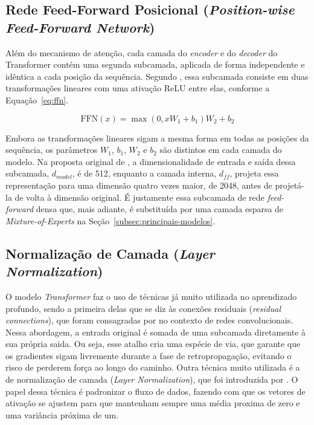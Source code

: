 \subsection{Rede Feed-Forward Posicional (\textit{Position-wise Feed-Forward Network})}

Além do mecanismo de atenção, cada camada do \textit{encoder} e do \textit{decoder} do Transformer contém uma segunda subcamada, aplicada de forma independente e idêntica a cada posição da sequência. Segundo \citet{vaswani2017attention}, essa subcamada consiste em duas transformações lineares com uma ativação ReLU entre elas, conforme a Equação~\eqref{eq:ffn}.

\begin{equation}
\text{FFN}(x) = \max(0, xW_1 + b_1)W_2 + b_2
\label{eq:ffn}
\end{equation}

Embora as transformações lineares sigam a mesma forma em todas as posições da sequência, os parâmetros $W_1$, $b_1$, $W_2$ e $b_2$ são distintos em cada camada do modelo. Na proposta original de \citet{vaswani2017attention}, a dimensionalidade de entrada e saída dessa subcamada, $d_{model}$, é de 512, enquanto a camada interna, $d_{ff}$, projeta essa representação para uma dimensão quatro vezes maior, de 2048, antes de projetá-la de volta à dimensão original. É justamente essa subcamada de rede \textit{feed-forward} densa que, mais adiante, é substituída por uma camada esparsa de \textit{Mixture-of-Experts} na Seção~\ref{subsec:principais-modelos}.


\subsection{Normalização de Camada (\textit{Layer Normalization})}

O modelo \textit{Transformer} faz o uso de técnicas já muito utilizada no aprendizado profundo, sendo a primeira delas que se diz às conexões residuais (\textit{residual connections}), que foram consagradas por \cite{he2016resnet} no contexto de redes convolucionais. Nessa abordagem, a entrada original é somada de uma subcamada diretamente à sua própria saida. Ou seja, esse atalho cria uma espécie de via, que garante que os gradientes sigam livremente durante a fase de retropropagação, evitando o risco de perderem força ao longo do caminho.
Outra técnica muito utilizada é a de normalização de camada  (\textit{Layer Normalization}), que foi introduzida por \cite{ba2016layernorm}. O papel dessa técnica é padronizar o fluxo de dados, fazendo com que os vetores de ativação se ajustem para que mantenham sempre uma média proxima de zero e uma variância próxima de um. %


